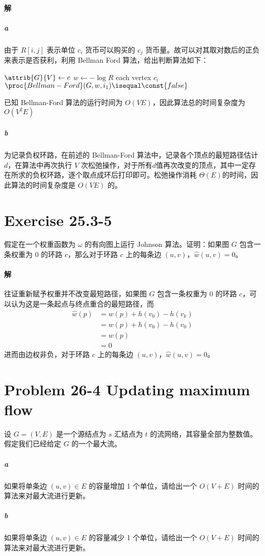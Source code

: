 \documentclass{article}
\begin{document}
\paragraph{解}
\subparagraph{a}

由于 $R[i, j]$ 表示单位 $c_i$ 货币可以购买的 $c_j$ 货币量。故可以对其取对数后的正负来表示是否获利，利用 Bellman Ford 算法，给出判断算法如下：
\begin{codebox}
	\li $\attrib{G}{V} \gets c$
	\li	$w \gets - \log{R}$
	\li \For each vertex $c_i$
		\Do
	\li 	\If $\proc{Bellman-Ford}(G, w, i_1) \isequal \const{false}$
			\Then
	\li 		\Return {}
			\End
		\End
	\li \Return {}
\end{codebox}
已知 Bellman-Ford 算法的运行时间为 $O(VE)$，因此算法总的时间复杂度为 $O(V^2 E)$
\subparagraph{b}
为记录负权环路，在前述的 Bellman-Ford 算法中，记录各个顶点的最短路径估计$d$，在算法中再次执行 $V$ 次松弛操作，对于所有$d$值再次改变的顶点，其中一定存在所求的负权环路，逐个取点成环后打印即可。松弛操作消耗 $\Theta(E)$的时间，因此算法的时间复杂度是 $O(VE)$ 的。

\section{Exercise 25.3-5}
假定在一个权重函数为 $\omega$ 的有向图上运行 Johnson 算法。证明：如果图 $G$ 包含一条权重为 $0$ 的环路 $c$，那么对于环路 $c$ 上的每条边 $(u, v)$，$\hat{w}(u,v) = 0$。

\paragraph{解}
往证重新赋予权重并不改变最短路径，如果图 $G$ 包含一条权重为 $0$ 的环路 $c$，可以认为这是一条起点与终点重合的最短路径，而
\begin{align*}
	\hat{w}(p) &= w(p) + h(v_0) - h(v_k) \\
	&= w(p) + h(v_0) - h(v_0) \\
	&= w(p) \\
	&= 0
\end{align*}
进而由边权非负，对于环路 $c$ 上的每条边 $(u, v)$，$\hat{w}(u,v) = 0$。

\section{Problem 26-4 Updating maximum flow}
设 $G = (V,E)$ 是一个源结点为 $s$ 汇结点为 $t$ 的流网络，其容量全部为整数值。假定我们已经给定 $G$ 的一个最大流。
\subparagraph{a} 如果将单条边 $(u, v) \in E$ 的容量增加 1 个单位，请给出一个 $O(V + E)$ 时间的算法来对最大流进行更新。
\subparagraph{b} 如果将单条边 $(u, v) \in E$ 的容量减少 1 个单位，请给出一个 $O(V + E)$ 时间的算法来对最大流进行更新。
\end{document}

